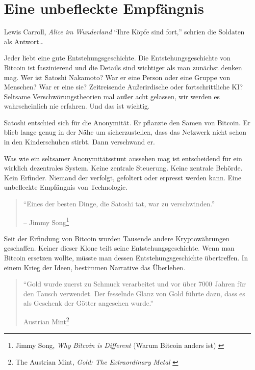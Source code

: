 \chapter{Eine unbefleckte Empfängnis}
\label{les:5}

\begin{chapquote}{Lewis Carroll, \textit{Alice im Wunderland}}
\enquote{Ihre Köpfe sind fort,} schrien die Soldaten als Antwort\ldots
\end{chapquote}

Jeder liebt eine gute Entstehungsgeschichte. Die Entstehungsgeschichte von
Bitcoin ist faszinierend und die Details sind wichtiger als man zunächst denken
mag. Wer ist Satoshi Nakamoto? War er eine Person oder eine Gruppe von Menschen?
War er eine sie? Zeitreisende Außerirdische oder fortschrittliche KI? Seltsame
Verschwörungstheorien mal außer acht gelassen, wir werden es wahrscheinlich nie
erfahren. Und das ist wichtig.

Satoshi entschied sich für die Anonymität. Er pflanzte den Samen von Bitcoin. Er
blieb lange genug in der Nähe um sicherzustellen, dass das Netzwerk nicht schon
in den Kinderschuhen stirbt. Dann verschwand er.

Was wie ein seltsamer Anonymitätsstunt aussehen mag ist entscheidend für ein
wirklich dezentrales System. Keine zentrale Steuerung. Keine zentrale Behörde.
Kein Erfinder. Niemand der verfolgt, gefoltert oder erpresst werden kann. Eine
unbefleckte Empfängnis von Technologie.

\begin{quotation}\begin{samepage}
\enquote{Eines der besten Dinge, die Satoshi tat, war zu verschwinden.}
\begin{flushright} -- Jimmy Song\footnote{Jimmy Song, \textit{Why Bitcoin is Different} (Warum Bitcoin anders ist) \cite{bitcoin-different}}
\end{flushright}\end{samepage}\end{quotation}

\newpage

Seit der Erfindung von Bitcoin wurden Tausende andere Kryptowährungen
geschaffen. Keiner dieser Klone teilt seine Entstehungsgeschichte. Wenn man
Bitcoin ersetzen wollte, müsste man dessen Entstehungsgeschichte übertreffen. In
einem Krieg der Ideen, bestimmen Narrative das Überleben.

\begin{quotation}\begin{samepage}
\enquote{Gold wurde zuerst zu Schmuck verarbeitet und vor über 7000 Jahren für
den Tausch verwendet. Der fesselnde Glanz von Gold führte dazu, dass es als
Geschenk der Götter angesehen wurde.}
\begin{flushright} Austrian Mint\footnote{The Austrian Mint, \textit{Gold: The Extraordinary Metal} \cite{gold-gift-gods}}
\end{flushright}\end{samepage}\end{quotation}

